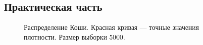 \documentclass[12pt, a4paper]{article}
\begin{document}

\subsection{Практическая часть}
\begin{figure}[H]
\caption{Распределение Коши. Красная кривая --- точные значения плотности. Размер выборки $5000$.}
\end{figure}
\end{document}
